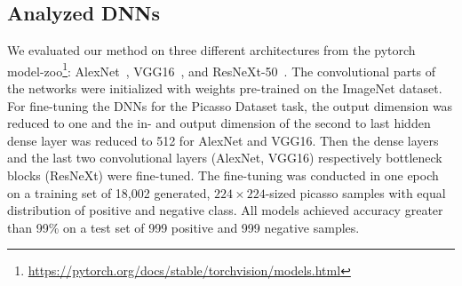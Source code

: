 \subsection{Analyzed DNNs}
We evaluated our method on three different architectures from the pytorch
model-zoo\footnote{\url{https://pytorch.org/docs/stable/torchvision/models.html}}:
AlexNet~\cite{krizhevsky_one_2014},
VGG16~\cite{simonyan_very_2015}, and
ResNeXt-50~\cite{xie_aggregated_2017}.
The convolutional parts of the networks were initialized with weights
pre-trained on the ImageNet dataset.
For fine-tuning the DNNs for the Picasso Dataset task,
% 
the output dimension was reduced to one and the in- and output
dimension of the second to last hidden dense layer was reduced to 512
for AlexNet and VGG16.
Then the dense layers and the last two convolutional layers
(AlexNet, VGG16) respectively bottleneck blocks (ResNeXt) were fine-tuned.
% 
The fine-tuning was conducted in one epoch on a training set of 18,002
generated, $224\times224$-sized picasso samples with equal
distribution of positive and negative class.
All models achieved accuracy greater than 99\%
on a test set of 999 positive and 999 negative samples.


